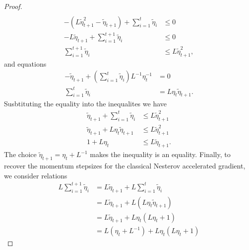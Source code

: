 \documentclass[12pt]{article}
\begin{document}
\begin{proof}
\begin{align*}
                \\
                - \left(
                    L\tilde \eta_{t + 1}^2 
                    - 
                    \tilde\eta_{t + 1}
                \right) + 
                \sum_{i = 1}^{t}\tilde \eta_i 
                &\le 0
                \\
                -L \tilde \eta_{t+1} + 
                \sum_{i = 1}^{t + 1} \tilde \eta_i 
                &\le 0
                \\
                \sum_{i = 1}^{t + 1}\tilde \eta_i 
                &\le L \tilde \eta_{t + 1}^2, 
            \end{align*}
            and equations 
            \begin{align*}
                -\tilde \eta_{t + 1} + 
                \left(
                    \sum_{i = 1}^{t}\tilde \eta_i
                \right)L^{-1}\eta_t^{-1} 
                &= 0
                \\
                \sum_{i = 1}^{t}\tilde \eta_i 
                &= 
                L \eta_t \tilde \eta_{t + 1}. 
            \end{align*}
            Susbtituting the equality into the inequalites we have 
            \begin{align*}
                \tilde \eta_{t + 1} + \sum_{i = 1}^{t} \tilde \eta_i 
                &\le L \tilde \eta_{t + 1}^2
                \\
                \tilde \eta_{t + 1} + L\eta_t \tilde \eta_{t + 1}
                &\le L \tilde \eta_{t + 1}^2
                \\
                1 + L\eta_t &\le L \tilde\eta_{t + 1}. 
            \end{align*}
            The choice $\tilde \eta_{t + 1} = \eta_t + L^{-1}$ makes the inequality is an equality. 
            Finally, to recover the momentum stepsizes for the classical Nesterov accelerated gradient, we consider relations 
            \begin{align*}
                L \sum_{i = 1}^{t + 1} \tilde \eta_i 
                &= L \tilde \eta_{t + 1} + L \sum_{i = 1}^{t} \tilde \eta_i 
                \\
                &= 
                L \tilde \eta_{t + 1} + L (L \eta_t \tilde \eta_{t + 1}) 
                \\
                &= L \tilde \eta_{t + 1} + L \eta_t (L \eta_t + 1)
                \\
                &= L (\eta_t + L^{-1}) + L\eta_t (L \eta_t + 1)

\end{align*}
\end{proof}
\end{document}
